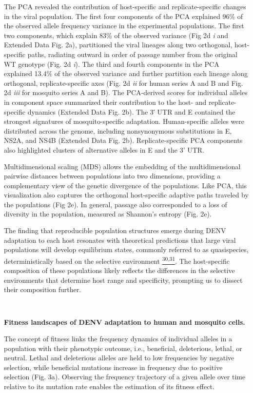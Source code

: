 \documentclass[
]{article}
\begin{document}
The PCA revealed the contribution of host-specific and
replicate-specific changes in the viral population. The first four
components of the PCA explained 96\% of the observed allele frequency
variance in the experimental populations. The first two components,
which explain 83\% of the observed variance (Fig 2d \emph{i} and
Extended Data Fig. 2a), partitioned the viral lineages along two
orthogonal, host-specific paths, radiating outward in order of passage
number from the original WT genotype (Fig. 2d \emph{i}). The third and
fourth components in the PCA explained 13.4\% of the observed variance
and further partition each lineage along orthogonal, replicate-specific
axes (Fig. 2d \emph{ii} for human series A and B and Fig. 2d \emph{iii}
for mosquito series A and B). The PCA-derived scores for individual
alleles in component space summarized their contribution to the host-
and replicate-specific dynamics (Extended Data Fig. 2b). The 3′ UTR and
E contained the strongest signatures of mosquito-specific adaptation.
Human-specific alleles were distributed across the genome, including
nonsynonymous substitutions in E, NS2A, and NS4B (Extended Data Fig.
2b). Replicate-specific PCA components also highlighted clusters of
alternative alleles in E and the 3' UTR.

Multidimensional scaling (MDS) allows the embedding of the
multidimensional pairwise distances between populations into two
dimensions, providing a complementary view of the genetic divergence of
the populations. Like PCA, this visualization also captures the
orthogonal host-specific adaptive paths traveled by the populations (Fig
2e). In general, passage also corresponded to a loss of diversity in the
population, measured as Shannon's entropy (Fig. 2e).

The finding that reproducible population structures emerge during DENV
adaptation to each host resonates with theoretical predictions that
large viral populations will develop equilibrium states, commonly
referred to as quasispecies, deterministically based on the selective
environment
\href{https://paperpile.com/c/REZjPf/Clw9O+rZbzc}{\textsuperscript{30,31}}.
The host-specific composition of these populations likely reflects the
differences in the selective environments that determine host range and
specificity, prompting us to dissect their composition further.

~

\textbf{Fitness landscapes of DENV adaptation to human and mosquito
cells.}

The concept of fitness links the frequency dynamics of individual
alleles in a population with their phenotypic outcome, i.e., beneficial,
deleterious, lethal, or neutral. Lethal and deleterious alleles are held
to low frequencies by negative selection, while beneficial mutations
increase in frequency due to positive selection (Fig. 3a). Observing the
frequency trajectory of a given allele over time relative to its
mutation rate enables the estimation of its fitness effect.
\end{document}
